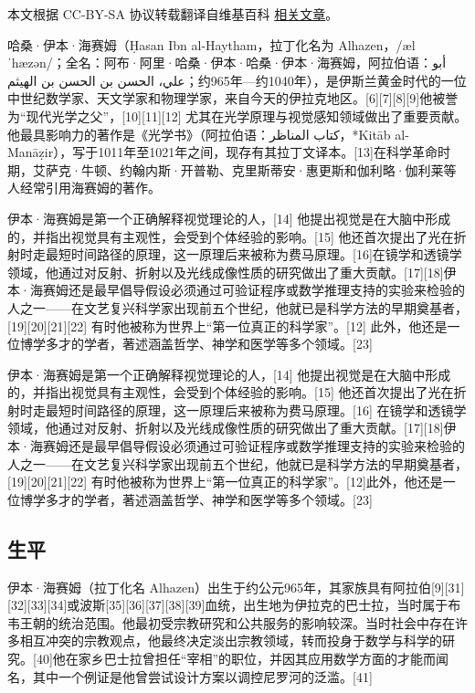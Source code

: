 
本文根据 CC-BY-SA 协议转载翻译自维基百科 \href{https://en.wikipedia.org/wiki/Ibn_al-Haytham}{相关文章}。

哈桑·伊本·海赛姆（Ḥasan Ibn al-Haytham，拉丁化名为 Alhazen，/ælˈhæzən/；全名：阿布·阿里·哈桑·伊本·哈桑·伊本·海赛姆，阿拉伯语：أبو علي، الحسن بن الحسن بن الهيثم；约965年—约1040年），是伊斯兰黄金时代的一位中世纪数学家、天文学家和物理学家，来自今天的伊拉克地区。[6][7][8][9]他被誉为“现代光学之父”，[10][11][12] 尤其在光学原理与视觉感知领域做出了重要贡献。他最具影响力的著作是《光学书》（阿拉伯语：كتاب المناظر，*Kitāb al-Manāẓir），写于1011年至1021年之间，现存有其拉丁文译本。[13]在科学革命时期，艾萨克·牛顿、约翰内斯·开普勒、克里斯蒂安·惠更斯和伽利略·伽利莱等人经常引用海赛姆的著作。

伊本·海赛姆是第一个正确解释视觉理论的人，[14] 他提出视觉是在大脑中形成的，并指出视觉具有主观性，会受到个体经验的影响。[15] 他还首次提出了光在折射时走最短时间路径的原理，这一原理后来被称为费马原理。[16]在镜学和透镜学领域，他通过对反射、折射以及光线成像性质的研究做出了重大贡献。[17][18]伊本·海赛姆还是最早倡导假设必须通过可验证程序或数学推理支持的实验来检验的人之一——在文艺复兴科学家出现前五个世纪，他就已是科学方法的早期奠基者，[19][20][21][22] 有时他被称为世界上“第一位真正的科学家”。[12]
此外，他还是一位博学多才的学者，著述涵盖哲学、神学和医学等多个领域。[23]

伊本·海赛姆是第一个正确解释视觉理论的人，[14] 他提出视觉是在大脑中形成的，并指出视觉具有主观性，会受到个体经验的影响。[15] 他还首次提出了光在折射时走最短时间路径的原理，这一原理后来被称为费马原理。[16] 在镜学和透镜学领域，他通过对反射、折射以及光线成像性质的研究做出了重大贡献。[17][18]伊本·海赛姆还是最早倡导假设必须通过可验证程序或数学推理支持的实验来检验的人之一——在文艺复兴科学家出现前五个世纪，他就已是科学方法的早期奠基者，[19][20][21][22] 有时他被称为世界上“第一位真正的科学家”。[12]此外，他还是一位博学多才的学者，著述涵盖哲学、神学和医学等多个领域。[23]
\subsection{生平}
伊本·海赛姆（拉丁化名 Alhazen）出生于约公元965年，其家族具有阿拉伯[9][31][32][33][34]或波斯[35][36][37][38][39]血统，出生地为伊拉克的巴士拉，当时属于布韦王朝的统治范围。他最初受宗教研究和公共服务的影响较深。当时社会中存在许多相互冲突的宗教观点，他最终决定淡出宗教领域，转而投身于数学与科学的研究。[40]他在家乡巴士拉曾担任“宰相”的职位，并因其应用数学方面的才能而闻名，其中一个例证是他曾尝试设计方案以调控尼罗河的泛滥。[41]

